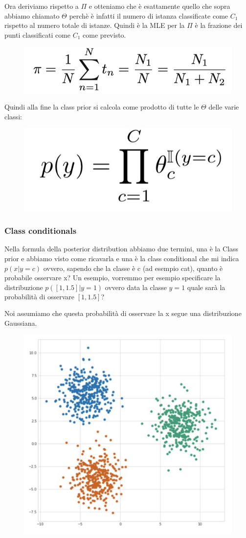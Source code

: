\documentclass[14pt]{extreport}
\begin{document}
Ora deriviamo rispetto a $\Pi$ e otteniamo che è esattamente quello che sopra abbiamo chiamato $\Theta$ perchè è infatti il numero di istanza
classificate come $C_1$ rispetto al numero totale di istanze. Quindi è la MLE per la $\Pi$ è la frazione dei punti classificati come $C_1$ come
previsto.

\begin{figure}[H]
\centering
\includegraphics[width=0.7\linewidth]{205.jpeg}
\end{figure}

Quindi alla fine la class prior si calcola come prodotto di tutte le $\Theta$ delle varie classi:

\begin{figure}[H]
\centering
\includegraphics[width=0.3\linewidth]{206.jpeg}
\end{figure}

\subsubsection{Class conditionals}

Nella formula della posterior distribution abbiamo due termini, una è la Class prior e abbiamo visto come ricavarla e una è la class conditional che
mi indica $p(x|y=c)$ ovvero, sapendo che la classe è c (ad esempio cat), quanto è probabile osservare x? Un esempio, vorremmo per esempio specificare
la distribuzione $p([1, 1.5]| y = 1)$ ovvero data la classe $y=1$ quale sarà la probabilità di osservare $[1, 1.5]$?

Noi assumiamo che questa probabilità di osservare la x segue una distribuzione Gaussiana. 
\begin{figure}[H]
\centering
\includegraphics[width=0.3\linewidth]{162.jpeg}
\end{figure}
\end{document}
